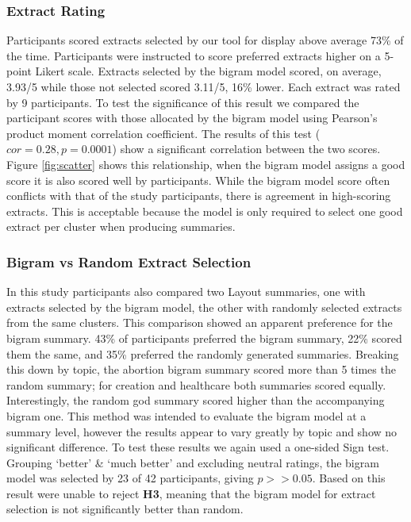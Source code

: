       \tocless\subsubsection{Extract Rating}
	      \noindent Participants scored extracts selected by our tool for display above average 73\% of the time. Participants were instructed to score preferred extracts higher on a 5-point Likert scale. Extracts selected by the bigram model scored, on average, 3.93/5 while those not selected scored 3.11/5, 16\% lower. Each extract was rated by 9 participants. To test the significance of this result we compared the participant scores with those allocated by the bigram model using Pearson's product moment correlation coefficient. The results of this test ($cor = 0.28, p = 0.0001$) show a significant correlation between the two scores. Figure \ref{fig:scatter} shows this relationship, when the bigram model assigns a good score it is also scored well by participants. While the bigram model score often conflicts with that of the study participants, there is agreement in high-scoring extracts. This is acceptable because the model is only required to select one good extract per cluster when producing summaries.

      \tocless\subsubsection{Bigram vs Random Extract Selection}
	      \noindent In this study participants also compared two Layout summaries, one with extracts selected by the bigram model, the other with randomly selected extracts from the same clusters. This comparison showed an apparent preference for the bigram summary. 43\% of participants preferred the bigram summary, 22\% scored them the same, and 35\% preferred the randomly generated summaries. Breaking this down by topic, the abortion bigram summary scored more than 5 times the random summary; for creation and healthcare both summaries scored equally. Interestingly, the random god summary scored higher than the accompanying bigram one. This method was intended to evaluate the bigram model at a summary level, however the results appear to vary greatly by topic and show no significant difference. To test these results we again used a one-sided Sign test. Grouping `better' \& `much better' and excluding neutral ratings, the bigram model was selected by 23 of 42 participants, giving $p >> 0.05$. Based on this result were unable to reject \textbf{H3}, meaning that the bigram model for extract selection is not significantly better than random.

